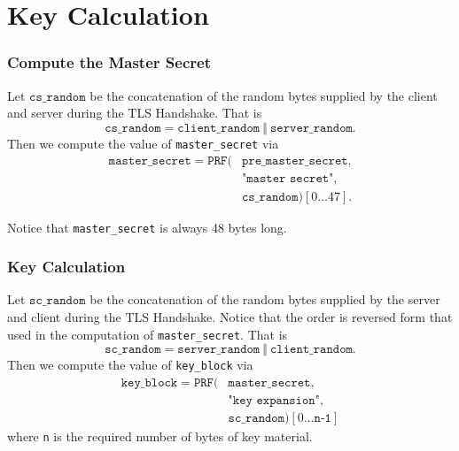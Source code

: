 \documentclass[aspectratio=169]{beamer}
\begin{document}
\section{Key Calculation}
\begin{frame}[Triangle=siiorange]
	\tocpage
\end{frame}

\begin{frame}[triangle=siiblue]
	\frametitle{Compute the Master Secret}
	Let $\texttt{cs\_random}$ be the concatenation of the random bytes supplied by the client and server during the TLS Handshake. That is
	\begin{equation} \nonumber
	\texttt{cs\_random} = \texttt{client\_random} \ \Vert \ \texttt{server\_random}.
	\end{equation}
	Then we compute the value of \texttt{master\_secret} via
	\begin{align*}
		\texttt{master\_secret} = \texttt{PRF}(&\texttt{pre\_master\_secret},\\
		&\texttt{"master secret"},\\
		&\texttt{cs\_random})[0\ldots 47].
	\end{align*}
	
	\vfill
	
	Notice that \texttt{master\_secret} is always 48 bytes long.
\end{frame}

\begin{frame}[triangle=siiblue]
	\frametitle{Key Calculation}
	Let $\texttt{sc\_random}$ be the concatenation of the random bytes supplied by the server and client during the TLS Handshake. Notice that the order is reversed form that used in the computation of \texttt{master\_secret}. That is
	\begin{equation} \nonumber
	\texttt{sc\_random} = \texttt{server\_random} \ \Vert \ \texttt{client\_random}.
	\end{equation}
	Then we compute the value of \texttt{key\_block} via
	\begin{equation} \nonumber
	\begin{split}
		\texttt{key\_block} = \texttt{PRF}(&\texttt{master\_secret}, \\
		&\texttt{"key expansion"},\\
		&\texttt{sc\_random})[0\ldots \texttt{n-1}]
	\end{split}
	\end{equation}
	where \texttt{n} is the required number of bytes of key material.
\end{frame}
\end{document}
